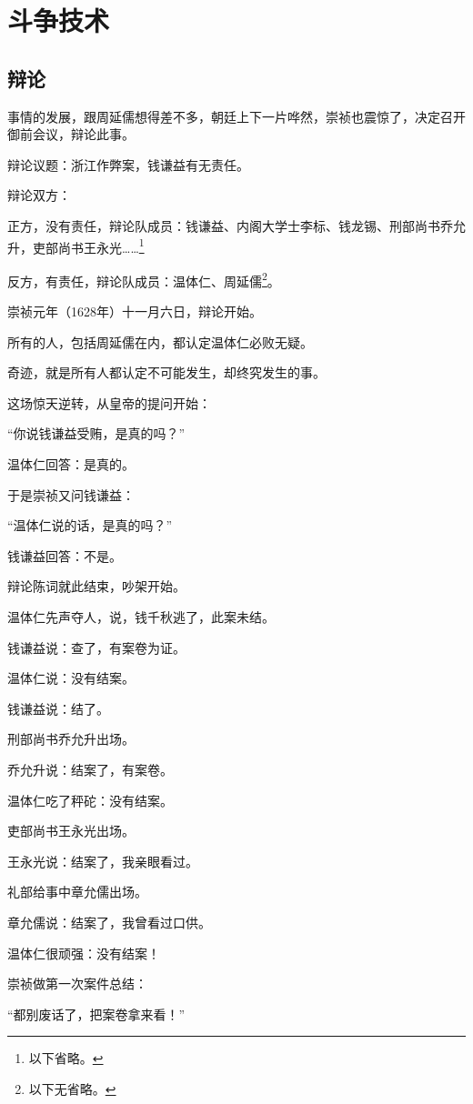 \section{斗争技术}
\ifnum{}
	\begin{multicols}{\theparacolNo}
\fi
\subsection{辩论}
事情的发展，跟周延儒想得差不多，朝廷上下一片哗然，崇祯也震惊了，决定召开御前会议，辩论此事。

辩论议题：浙江作弊案，钱谦益有无责任。

辩论双方：

正方，没有责任，辩论队成员：钱谦益、内阁大学士李标、钱龙锡、刑部尚书乔允升，吏部尚书王永光……\footnote{以下省略。}

反方，有责任，辩论队成员：温体仁、周延儒\footnote{以下无省略。}。

崇祯元年（1628年）十一月六日，辩论开始。

所有的人，包括周延儒在内，都认定温体仁必败无疑。

奇迹，就是所有人都认定不可能发生，却终究发生的事。

这场惊天逆转，从皇帝的提问开始：

“你说钱谦益受贿，是真的吗？”

温体仁回答：是真的。

于是崇祯又问钱谦益：

“温体仁说的话，是真的吗？”

钱谦益回答：不是。

辩论陈词就此结束，吵架开始。

温体仁先声夺人，说，钱千秋逃了，此案未结。

钱谦益说：查了，有案卷为证。

温体仁说：没有结案。

钱谦益说：结了。

刑部尚书乔允升出场。

乔允升说：结案了，有案卷。

温体仁吃了秤砣：没有结案。

吏部尚书王永光出场。

王永光说：结案了，我亲眼看过。

礼部给事中章允儒出场。

章允儒说：结案了，我曾看过口供。

温体仁很顽强：没有结案！

崇祯做第一次案件总结：

“都别废话了，把案卷拿来看！”


\end{multicols}
